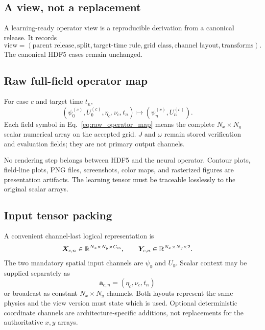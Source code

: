 \documentclass[11pt]{article}
\newcommand{\vect}[1]{\bm{#1}}
\newcommand{\mat}[1]{\bm{#1}}
\begin{document}
\subsection{A view, not a replacement}
A learning-ready operator view is a reproducible derivation from a canonical release. It records
\begin{equation}
\text{view}=(\text{parent release},\text{split},\text{target-time rule},\text{grid class},\text{channel layout},\text{transforms}).
\end{equation}
The canonical HDF5 cases remain unchanged.

\subsection{Raw full-field operator map}
For case $c$ and target time $t_n$,
\begin{equation}
\boxed{\left(\psi^{(c)}_0,U^{(c)}_0,\eta_c,\nu_c,t_n\right)\longmapsto\left(\psi^{(c)}_n,U^{(c)}_n\right)}.
\label{eq:raw_operator_map}
\end{equation}
Each field symbol in Eq.~\eqref{eq:raw_operator_map} means the complete $N_x\times N_y$ scalar numerical array on the accepted grid. $J$ and $\omega$ remain stored verification and evaluation fields; they are not primary output channels.

\begin{warningbox}
No rendering step belongs between HDF5 and the neural operator. Contour plots, field-line plots, PNG files, screenshots, color maps, and rasterized figures are presentation artifacts. The learning tensor must be traceable losslessly to the original scalar arrays.
\end{warningbox}

\subsection{Input tensor packing}
A convenient channel-last logical representation is
\begin{equation}
\mat X_{c,n}\in\mathbb R^{N_x\times N_y\times C_{\rm in}},\qquad
\mat Y_{c,n}\in\mathbb R^{N_x\times N_y\times 2}.
\end{equation}
The two mandatory spatial input channels are $\psi_0$ and $U_0$. Scalar context may be supplied separately as
\begin{equation}
\vect a_{c,n}=(\eta_c,\nu_c,t_n)
\end{equation}
or broadcast as constant $N_x\times N_y$ channels. Both layouts represent the same physics and the view version must state which is used. Optional deterministic coordinate channels are architecture-specific additions, not replacements for the authoritative $x,y$ arrays.
\end{document}
